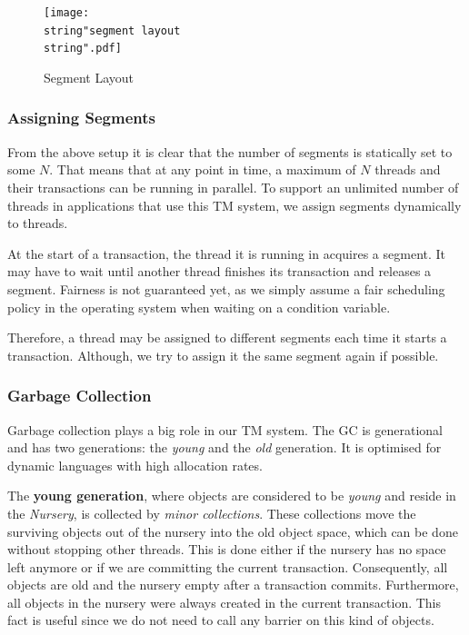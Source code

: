 \documentclass{sigplanconf}
\begin{document}
\begin{figure}[t]
  \begin{centering}
    \texttt{[image: \\string"segment layout\\string".pdf]}
    \par\end{centering}

    \protect\caption{Segment Layout\label{fig:Segment-Layout}}
\end{figure}



\subsubsection{Assigning Segments}

From the above setup it is clear that the number of segments is
statically set to some $N$. That means that at any point in time, a
maximum of $N$ threads and their transactions can be running in
parallel.  To support an unlimited number of threads in applications
that use this TM system, we assign segments dynamically to threads.

At the start of a transaction, the thread it is running in acquires a
segment. It may have to wait until another thread finishes its
transaction and releases a segment. Fairness is not guaranteed yet, as
we simply assume a fair scheduling policy in the operating system when
waiting on a condition variable.

Therefore, a thread may be assigned to different segments each time it
starts a transaction. Although, we try to assign it the same segment
again if possible.




\subsubsection{Garbage Collection}

Garbage collection plays a big role in our TM system. The GC is
generational and has two generations: the \emph{young} and the
\emph{old} generation. It is optimised for dynamic languages with
high allocation rates.

The \textbf{young generation}, where objects are considered to be
\emph{young} and reside in the \emph{Nursery}, is collected by
\emph{minor collections}. These collections move the surviving objects
out of the nursery into the old object space, which can be done
without stopping other threads. This is done either if the nursery has
no space left anymore or if we are committing the current
transaction. Consequently, all objects are old and the nursery empty
after a transaction commits.  Furthermore, all objects in the nursery
were always created in the current transaction. This fact is useful
since we do not need to call any barrier on this kind of objects.
\end{document}
